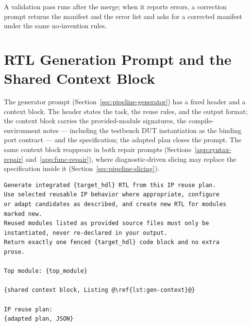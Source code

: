 A validation pass runs after the merge; when it reports errors, a
correction prompt returns the manifest and the error list and asks for a
corrected manifest under the same no-invention rules.

\section{RTL Generation Prompt and the Shared Context Block}
\label{app:generation}

The generator prompt (Section~\ref{sec:pipeline-generator}) has a fixed
header and a context block. The header states the task, the reuse rules,
and the output format; the context block carries the provided-module
signatures, the compile-environment notes --- including the testbench
DUT instantiation as the binding port contract --- and the
specification; the adapted plan closes the prompt. The same context
block reappears in both repair prompts
(Sections~\ref{app:syntax-repair} and~\ref{app:func-repair}), where
diagnostic-driven slicing may replace the specification inside it
(Section~\ref{sec:pipeline-slicing}).

\begin{lstlisting}[language={},escapechar=@,caption={RTL generation prompt,
header and skeleton.},label={lst:gen-prompt}]
Generate integrated {target_hdl} RTL from this IP reuse plan.
Use selected reusable IP behavior where appropriate, configure
or adapt candidates as described, and create new RTL for modules
marked new.
Reused modules listed as provided source files must only be
instantiated, never re-declared in your output.
Return exactly one fenced {target_hdl} code block and no extra
prose.

Top module: {top_module}

{shared context block, Listing @\ref{lst:gen-context}@}

IP reuse plan:
{adapted plan, JSON}
\end{lstlisting}

